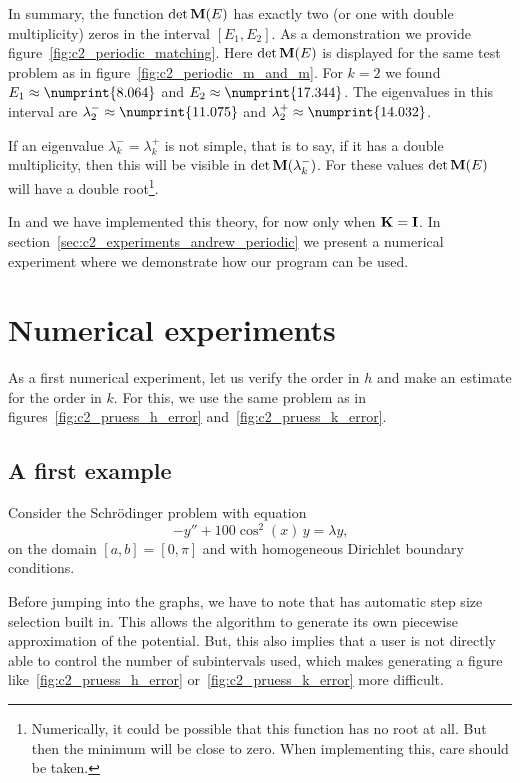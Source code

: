In summary, the function $\det\vb{M}(E)$ has exactly two (or one with double multiplicity) zeros in the interval $[E_1, E_2]$. As a demonstration we provide figure~\ref{fig:c2_periodic_matching}. Here $\det\vb{M}(E)$ is displayed for the same test problem as in figure~\ref{fig:c2_periodic_m_and_m}. For $k = 2$ we found $E_1 \approx \numprint{8.064}$ and $E_2 \approx \numprint{17.344}$. The eigenvalues in this interval are $\lambda_2^{-} \approx \numprint{11.075}$ and $\lambda_2^{+} \approx \numprint{14.032}$.

If an eigenvalue $\lambda^{-}_k = \lambda^{+}_k$ is not simple, that is to say, if it has a double multiplicity, then this will be visible in $\det\vb{M}(\lambda^{-}_k)$. For these values $\det\vb{M}(E)$ will have a double root\footnote{Numerically, it could be possible that this function has no root at all. But then the minimum will be close to zero. When implementing this, care should be taken.}.

In  and \pyslise{} we have implemented this theory, for now only when $\vb{K} = \vb{I}$. In section~\ref{sec:c2_experiments_andrew_periodic} we present a numerical experiment where we demonstrate how our program can be used.


\section{Numerical experiments}\label{sec:c2_numerical_experiments}

As a first numerical experiment, let us verify the order in $h$ and make an estimate for the order in $k$. For this, we use the same problem as in figures~\ref{fig:c2_pruess_h_error} and~\ref{fig:c2_pruess_k_error}.

\subsection{A first example}

Consider the Schrödinger problem with equation
\begin{equation}\label{equ:c2_matslise_order_test_problem}
    -y'' + 100\cos^2(x)\,y = \lambda y\text{,}
\end{equation}
on the domain $[a, b] = [0, \pi]$ and with homogeneous Dirichlet boundary conditions.

Before jumping into the graphs, we have to note that  has automatic step size selection built in. This allows the algorithm to generate its own piecewise approximation of the potential. But, this also implies that a user is not directly able to control the number of subintervals used, which makes generating a figure like~\ref{fig:c2_pruess_h_error} or~\ref{fig:c2_pruess_k_error} more difficult.

